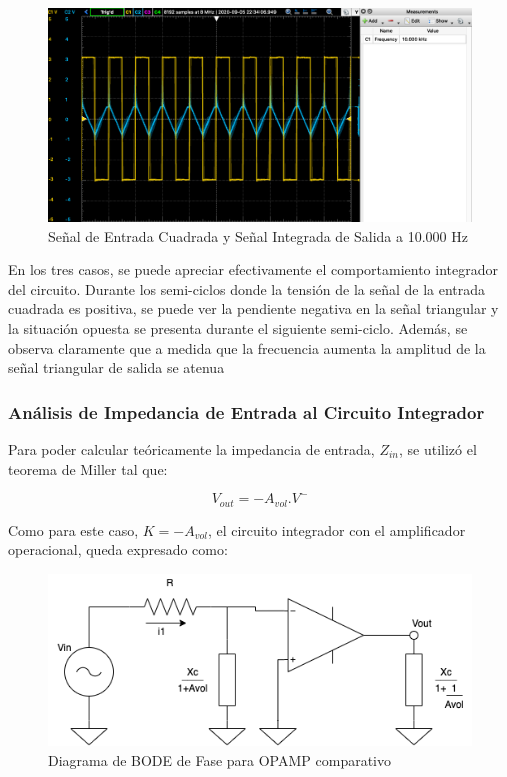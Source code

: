 \begin{figure}[H]
    \centering 
    \includegraphics [scale=1] {../Ejercicio3-CircuitoIntegradoresyDerivadores/Imagenes/cuadrada-10000.png} 
    \caption{Señal de Entrada Cuadrada y Señal Integrada de Salida a 10.000 Hz}
    \label{fig:emptyPlotTool}
\end{figure}

En los tres casos, se puede apreciar efectivamente el comportamiento integrador del circuito. Durante los semi-ciclos donde la tensión de la señal 
de la entrada cuadrada es positiva, se puede ver la pendiente negativa en la señal triangular y la situación opuesta se presenta durante el siguiente semi-ciclo.
Además, se observa claramente que a medida que la frecuencia aumenta la amplitud de la señal triangular de salida se atenua

\subsubsection{Análisis de Impedancia de Entrada al Circuito Integrador}

Para poder calcular teóricamente la impedancia de entrada, $Z_{in}$, se utilizó el teorema de Miller tal que:

$$ V_{out}=-A_{vol}.V^-$$

Como para este caso, $K=-A_{vol}$, el circuito integrador con el amplificador operacional, queda expresado como:

\begin{figure}[H]
    \centering 
    \includegraphics [scale=0.7] {../Ejercicio3-CircuitoIntegradoresyDerivadores/Imagenes/miller-integrador.png} 
    \caption{Diagrama de BODE de Fase para OPAMP comparativo }
    \label{fig:emptyPlotTool}
\end{figure}

